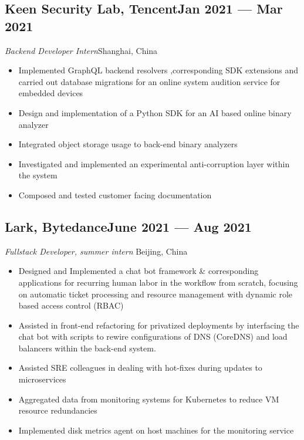 \documentclass[a4,12pt]{article}
\newcommand{\subtext}[1]{
#1\par\vspace{-0.3cm}}
\newenvironment{zitemize}{
\begin{itemize}\itemsep0pt \parskip0pt \parsep1pt}
{\end{itemize}\vspace{-0.5cm}}
\begin{document}
\subsection*{Keen Security Lab, Tencent\hfill Jan 2021 --- Mar 2021} 
\subtext{\textit{Backend Developer Intern}\hfill Shanghai, China} 
    \begin{zitemize}
        \item Implemented GraphQL backend resolvers ,corresponding SDK extensions and carried out database migrations for an online system audition service for embedded devices
        \item Design and implementation of a Python SDK for an AI based online binary analyzer
        \item Integrated object storage usage to back-end binary analyzers
        \item Investigated and implemented an experimental anti-corruption layer within the system
        \item Composed and tested customer facing documentation 
    \end{zitemize}


\subsection*{Lark, Bytedance\hfill June 2021 --- Aug 2021} 
\subtext{\textit{Fullstack Developer, summer intern } \hfill Beijing, China} 
    \begin{zitemize}
        \item Designed and Implemented a chat bot framework \& corresponding applications for recurring human labor in the workflow from scratch, focusing on automatic ticket processing and resource management with dynamic role based access control (RBAC)
        \item Assisted in front-end refactoring for privatized deployments by interfacing the chat bot with scripts to rewire configurations of DNS (CoreDNS) and load balancers within the back-end system.
        \item Assisted SRE colleagues in dealing with hot-fixes during updates to microservices
        \item Aggregated data from monitoring systems for Kubernetes to reduce VM resource redundancies
        \item Implemented disk metrics agent on host machines for the monitoring service
    \end{zitemize}
\end{document}
